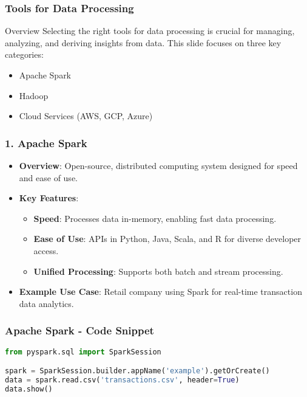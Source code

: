 \documentclass{beamer}
\begin{document}
\begin{frame}[fragile]
    \frametitle{Tools for Data Processing}
    \begin{block}{Overview}
        Selecting the right tools for data processing is crucial for managing, analyzing, and deriving insights from data. 
        This slide focuses on three key categories: 
        \begin{itemize}
            \item Apache Spark
            \item Hadoop
            \item Cloud Services (AWS, GCP, Azure)
        \end{itemize}
    \end{block}
\end{frame}

\begin{frame}[fragile]
    \frametitle{1. Apache Spark}
    \begin{itemize}
        \item \textbf{Overview}: Open-source, distributed computing system designed for speed and ease of use.
        \item \textbf{Key Features}:
        \begin{itemize}
            \item \textbf{Speed}: Processes data in-memory, enabling fast data processing.
            \item \textbf{Ease of Use}: APIs in Python, Java, Scala, and R for diverse developer access.
            \item \textbf{Unified Processing}: Supports both batch and stream processing.
        \end{itemize}
        \item \textbf{Example Use Case}: Retail company using Spark for real-time transaction data analytics.
    \end{itemize}
\end{frame}

\begin{frame}[fragile]
    \frametitle{Apache Spark - Code Snippet}
    \begin{lstlisting}[language=Python]
from pyspark.sql import SparkSession

spark = SparkSession.builder.appName('example').getOrCreate()
data = spark.read.csv('transactions.csv', header=True)
data.show()
    \end{lstlisting}
\end{frame}
\end{document}
